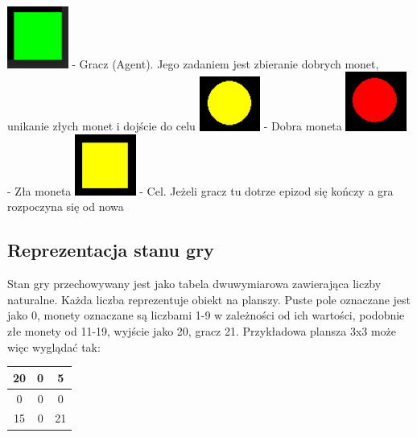 \documentclass[a4paper,12pt]{article}
\begin{document}
\includegraphics[width=20mm]{player.png} - Gracz (Agent). Jego zadaniem jest zbieranie dobrych monet, unikanie złych monet i dojście do celu \newline
\includegraphics[width=20mm]{good_coin.png} - Dobra moneta \newline
\includegraphics[width=20mm]{bad_coin.png} - Zła moneta\newline
\includegraphics[width=20mm]{exit.png} - Cel. Jeżeli gracz tu dotrze epizod się kończy a gra rozpoczyna się od nowa\newline

\subsection{Reprezentacja stanu gry}

Stan gry przechowywany jest jako tabela dwuwymiarowa zawierająca liczby naturalne. Każda liczba reprezentuje obiekt na planszy. Puste pole oznaczane jest jako 0, monety oznaczane są liczbami 1-9 w zależności od ich wartości, podobnie złe monety od 11-19, wyjście jako 20, gracz 21. Przykładowa plansza 3x3 może więc wyglądać tak:

\begin{center}
\begin{tabular}{ |c|c|c| }
\hline
20 & 0 & 5 \\
\hline
0 & 0 & 0 \\
\hline
15 & 0 & 21 \\
\hline
\end{tabular}
\newline
\end{center} 
\end{document}

